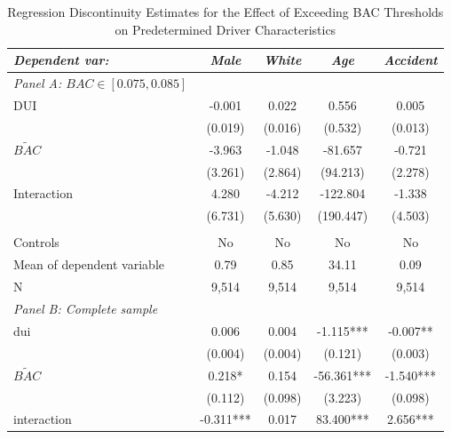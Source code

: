 \documentclass[11pt]{article}\usepackage[]{graphicx}\usepackage[]{color}
\begin{document}
\begin{enumerate}
 \begin{table}[htbp]\centering
\small
\caption{Regression Discontinuity Estimates for the Effect of Exceeding BAC Thresholds on Predetermined Driver Characteristics}
\label{table:balancetest}
\begin{center}
\begin{threeparttable}
\begin{tabular}{l*{4}{c}}
\toprule
\multicolumn{1}{l}{\textit{Dependent var: }}&
\multicolumn{1}{c}{\textit{Male}}&
\multicolumn{1}{c}{\textit{White}}&
\multicolumn{1}{c}{\textit{Age}}&
\multicolumn{1}{c}{\textit{Accident}}\\
\midrule
\textit{Panel A: $BAC \in [0.075, 0.085]$ } & 		&			& 			& 		\\
DUI                 &      -0.001   &       0.022   &       0.556   &       0.005   \\
                    &     (0.019)   &     (0.016)   &     (0.532)   &     (0.013)   \\
$\tilde{BAC}$              &      -3.963   &      -1.048   &     -81.657   &      -0.721   \\
                    &     (3.261)   &     (2.864)   &    (94.213)   &     (2.278)   \\
Interaction         &       4.280   &      -4.212   &    -122.804   &      -1.338   \\
                    &     (6.731)   &     (5.630)   &   (190.447)   &     (4.503)   \\
			&		&			&		&			\\
Controls   & No			& No			& No 	& No \\
Mean of dependent variable&        0.79   &        0.85   &       34.11   &        0.09   \\
N                   &       9,514   &       9,514   &       9,514   &       9,514   \\
\midrule
\textit{Panel B: Complete sample} & 		&			& 			& 		\\
dui                 &       0.006   &       0.004   &      -1.115***&      -0.007** \\
                    &     (0.004)   &     (0.004)   &     (0.121)   &     (0.003)   \\
$\tilde{BAC}$             &       0.218*  &       0.154   &     -56.361***&      -1.540***\\
                    &     (0.112)   &     (0.098)   &     (3.223)   &     (0.098)   \\
interaction         &      -0.311***&       0.017   &      83.400***&       2.656***\\

\end{tabular}
\end{threeparttable}
\end{center}
\end{table}
\end{enumerate}
\end{document}
